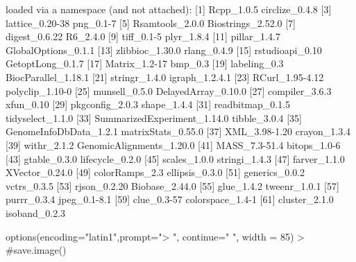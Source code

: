 \documentclass[a4paper,10pt]{article}
\begin{document}
\begin{Schunk}
\begin{Soutput}
loaded via a namespace (and not attached):
 [1] Rcpp_1.0.5                  circlize_0.4.8             
 [3] lattice_0.20-38             png_0.1-7                  
 [5] Rsamtools_2.0.0             Biostrings_2.52.0          
 [7] digest_0.6.22               R6_2.4.0                   
 [9] tiff_0.1-5                  plyr_1.8.4                 
[11] pillar_1.4.7                GlobalOptions_0.1.1        
[13] zlibbioc_1.30.0             rlang_0.4.9                
[15] rstudioapi_0.10             GetoptLong_0.1.7           
[17] Matrix_1.2-17               bmp_0.3                    
[19] labeling_0.3                BiocParallel_1.18.1        
[21] stringr_1.4.0               igraph_1.2.4.1             
[23] RCurl_1.95-4.12             polyclip_1.10-0            
[25] munsell_0.5.0               DelayedArray_0.10.0        
[27] compiler_3.6.3              xfun_0.10                  
[29] pkgconfig_2.0.3             shape_1.4.4                
[31] readbitmap_0.1.5            tidyselect_1.1.0           
[33] SummarizedExperiment_1.14.0 tibble_3.0.4               
[35] GenomeInfoDbData_1.2.1      matrixStats_0.55.0         
[37] XML_3.98-1.20               crayon_1.3.4               
[39] withr_2.1.2                 GenomicAlignments_1.20.0   
[41] MASS_7.3-51.4               bitops_1.0-6               
[43] gtable_0.3.0                lifecycle_0.2.0            
[45] scales_1.0.0                stringi_1.4.3              
[47] farver_1.1.0                XVector_0.24.0             
[49] colorRamps_2.3              ellipsis_0.3.0             
[51] generics_0.0.2              vctrs_0.3.5                
[53] rjson_0.2.20                Biobase_2.44.0             
[55] glue_1.4.2                  tweenr_1.0.1               
[57] purrr_0.3.4                 jpeg_0.1-8.1               
[59] clue_0.3-57                 colorspace_1.4-1           
[61] cluster_2.1.0               isoband_0.2.3              
\end{Soutput}
\begin{Sinput}
  options(encoding="latin1",prompt=">  ", continue=" ", width = 85)
>  #save.image()
\end{Sinput}
\end{Schunk}
\end{document}
